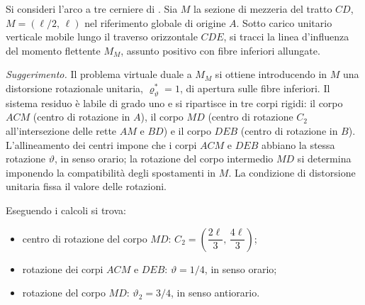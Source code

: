 



\begin{esercizio}
	\label{ex:LI_MM_arco}
	
	Si consideri l'arco a tre cerniere di
	. Sia $M$ la sezione di mezzeria del
	tratto $CD$, $M = (\ell/2,\,\ell)$ nel riferimento globale di
	origine $A$. Sotto carico unitario verticale mobile lungo il
	traverso orizzontale $CDE$, si tracci la linea d'influenza del
	momento flettente $M_M$, assunto positivo con fibre inferiori
	allungate.
	
	\textit{Suggerimento.} Il problema virtuale duale a $M_M$ si
	ottiene introducendo in $M$ una distorsione rotazionale
	unitaria, $\varrho_\vartheta^{*} = 1$, di apertura sulle fibre
	inferiori. Il sistema residuo è labile di grado uno e si
	ripartisce in tre corpi rigidi: il corpo $ACM$ (centro di
	rotazione in $A$), il corpo $MD$ (centro di rotazione $C_2$
	all'intersezione delle rette $AM$ e $BD$) e il corpo $DEB$
	(centro di rotazione in $B$). L'allineamento dei centri impone
	che i corpi $ACM$ e $DEB$ abbiano la stessa rotazione
	$\vartheta$, in senso orario; la rotazione del corpo intermedio
	$MD$ si determina imponendo la compatibilità degli spostamenti
	in $M$. La condizione di distorsione unitaria fissa il valore
	delle rotazioni.
	
	Eseguendo i calcoli si trova:
	\begin{itemize}[noitemsep,topsep=2pt]
		\item centro di rotazione del corpo $MD$:
		$C_2 = \left(\dfrac{2\ell}{3},\,\dfrac{4\ell}{3}\right)$;
		\item rotazione dei corpi $ACM$ e $DEB$: $\vartheta = 1/4$,
		in senso orario;
		\item rotazione del corpo $MD$: $\vartheta_2 = 3/4$, in
		senso antiorario.
	\end{itemize}
	

\end{esercizio}
